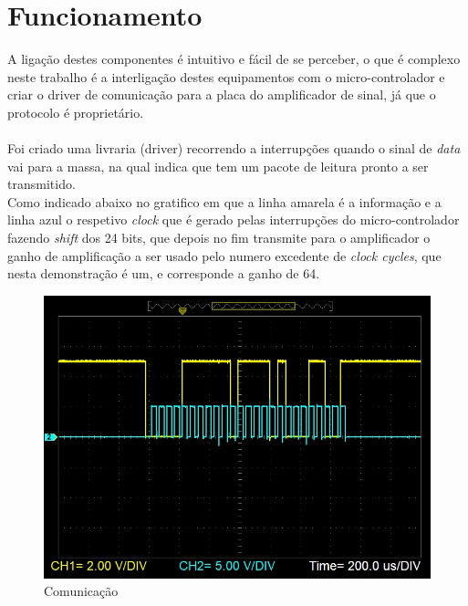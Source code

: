 \section{Funcionamento}
A ligação destes componentes é intuitivo e fácil de se perceber, o que é complexo neste trabalho é a interligação destes equipamentos com o micro-controlador e criar o driver de comunicação para a placa do amplificador de sinal, já que o protocolo é proprietário.\\
\\
Foi criado uma livraria (driver) recorrendo a interrupções quando o sinal de \textit{data} vai para a massa, na qual indica que tem um pacote de leitura pronto a ser transmitido.\\
Como indicado abaixo no gratifico em que a linha amarela é a informação e a linha azul o respetivo \textit{clock} que é gerado pelas interrupções do micro-controlador fazendo \textit{shift} dos 24 bits, que depois no fim transmite para o amplificador o ganho de amplificação a ser usado pelo numero excedente de \textit{clock cycles}, que nesta demonstração é um, e corresponde a ganho de 64.
\begin{figure}[H]
	\centering
	\includegraphics[scale=0.65]{./image/PESTA/graph/DataClkPacket_1.JPG}
	\caption{Comunicação}
	\label{DataClkPacket_1}
\end{figure}






